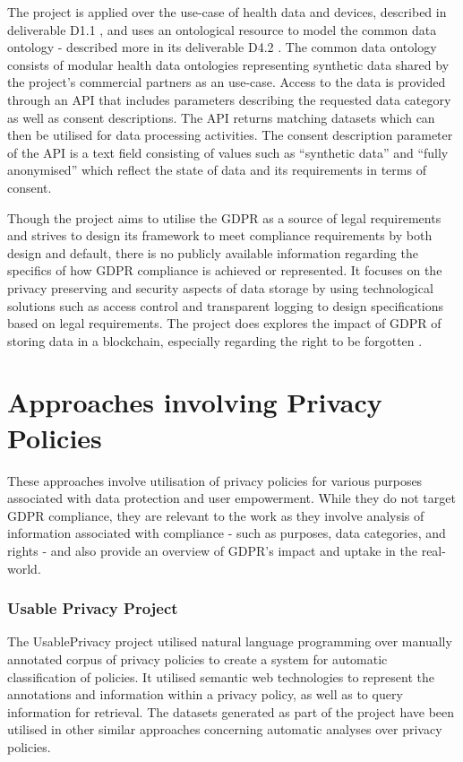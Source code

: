 The project is applied over the use-case of health data and devices, described in deliverable D1.1 \cite{noauthor_d1.1_initial-list--main-requirements.pdf_nodate}, and uses an ontological resource to model the common data ontology - described more in its deliverable D4.2 \cite{teodoro_d4.2-mhmd-ontological-resources.pdf_2018}. The common data ontology consists of modular health data ontologies representing synthetic data shared by the project's commercial partners as an use-case.
Access to the data is provided through an API that includes parameters describing the requested data category as well as consent descriptions. The API returns matching datasets which can then be utilised for data processing activities. The consent description parameter of the API is a text field consisting of values such as ``synthetic data'' and ``fully anonymised'' which reflect the state of data and its requirements in terms of consent. 

Though the project aims to utilise the GDPR as a source of legal requirements and strives to design its framework to meet compliance requirements by both design and default, there is no publicly available information regarding the specifics of how GDPR compliance is achieved or represented.
It focuses on the privacy preserving and security aspects of data storage by using technological solutions such as access control and transparent logging to design specifications based on legal requirements.
The project does explores the impact of GDPR of storing data in a blockchain, especially regarding the right to be forgotten \cite{bayle_when_2018}.

\section{Approaches involving Privacy Policies}\label{sec:sota:privacy-policies}
These approaches involve utilisation of privacy policies for various purposes associated with data protection and user empowerment. While they do not target GDPR compliance, they are relevant to the work as they involve analysis of information associated with compliance - such as purposes, data categories, and rights - and also provide an overview of GDPR's impact and uptake in the real-world.

\subsubsection{Usable Privacy Project}
The UsablePrivacy project \cite{sadeh_usable_2013} utilised natural language programming over manually annotated corpus of privacy policies to create a system for automatic classification of policies. 
It utilised semantic web technologies \cite{oltramari_privonto:_2018} to represent the annotations and information within a privacy policy, as well as to query information for retrieval.
The datasets generated as part of the project have been utilised in other similar approaches \cite{harkous_polisis:_2018,linden_privacy_2018} concerning automatic analyses over privacy policies. 

